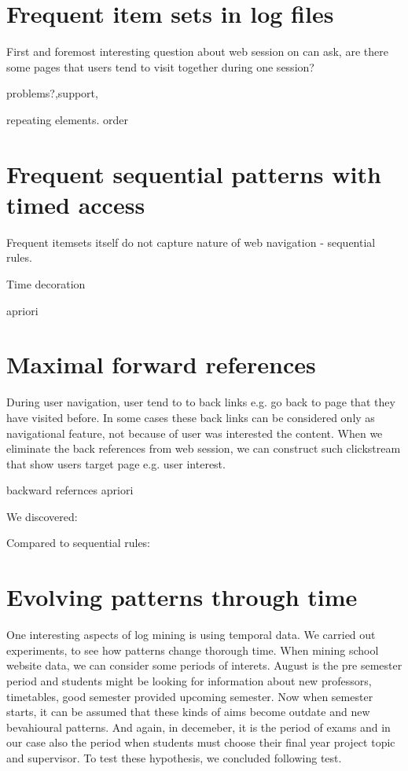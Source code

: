 \documentclass[english,a4paper]{article}
\begin{document}
\section{Frequent item sets in log files} 
First and foremost interesting question about web session on can ask, are there some pages that users tend to visit together during one session?



problems?,support,

repeating elements. order


\section{Frequent sequential patterns with timed access}
Frequent itemsets itself do not capture nature of web navigation - sequential rules. 

Time decoration

apriori 

\section{Maximal forward references}
During user navigation, user tend to to back links e.g. go back to page that they have visited before. In some cases these back links can be considered only as navigational feature, not because of user was interested the content.  When we eliminate the back references from web session, we can construct such clickstream that show users target page e.g. user interest.

backward refernces
apriori

We discovered:

Compared to sequential rules:


\section{Evolving patterns through time} 
One interesting aspects of log mining is using temporal data. We carried out experiments, to see how patterns change thorough time. When mining school website data, we can consider some periods of interets. August is the pre semester period and students might be looking for information about new professors, timetables, good semester provided upcoming semester. Now when semester starts, it can be assumed that these kinds of aims become outdate and new bevahioural patterns. And again, in decemeber, it is the period of exams and in our case also the period when students must choose their final year project topic and supervisor. To test these hypothesis, we concluded following test. 
\end{document}

